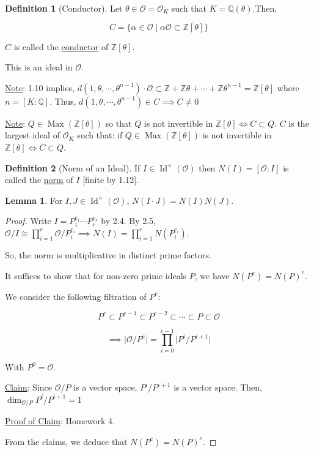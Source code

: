 \documentclass[openany]{amsbook}
\numberwithin{section}{chapter}
\theoremstyle{definition}
\newtheorem*{definition}{Definition}
\newtheorem{lemma}[theorem]{Lemma}
\begin{document}
\begin{definition}[Conductor]
    Let \(\theta \in \mathcal{O} = \mathcal{O}_K\) such that \(K = \mathbb{Q} (\theta)\).Then,

    \[
        C = \{ \alpha \in \mathcal{O} \mid \alpha \mathcal{O} \subset \mathbb{Z} [\theta] \} 
    \]

    \(C\) is called the \underline{conductor} of \(\mathbb{Z} [\theta]\).

    This is an ideal in \(\mathcal{O}\). 

    \underline{Note}: 1.10 implies, \(d(1, \theta , \cdots , \theta^{n-1})\cdot \mathcal{O} \subset \mathbb{Z} + \mathbb{Z} \theta + \cdots + \mathbb{Z} \theta ^{n-1} = \mathbb{Z} [\theta]\) where \(n = [K : \mathbb{Q}]\). Thus, \(d(1, \theta , \cdots , \theta^{n-1}) \in C \implies C \neq 0\)  

    \underline{Note}: \(Q\in \operatorname{Max} (\mathbb{Z} [\theta])\) so that \(Q\) is not invertible in \(\mathbb{Z}[\theta] \iff C \subset Q\). \(C\) is the largest ideal of \(\mathcal{O}_K\) such that: if \(Q \in \operatorname{Max}(\mathbb{Z}[\theta])\) is not invertible in \(\mathbb{Z} [\theta] \iff C \subset Q\).   

\end{definition}

\begin{definition}[Norm of an Ideal]
    If \(I \in \operatorname{Id} ^\times (\mathcal{O})\) then \(N(I) = [\mathcal{O} : I]\) is called the \underline{norm} of \(I\) [finite by 1.12].
\end{definition}

\begin{lemma}
    For \(I, J \in \operatorname{Id} ^\times (\mathcal{O})\), \(N(I \cdot J) = N(I)N(J)\).
\end{lemma}

\begin{proof}
    Write \(I = P_1^{e_1} \cdots P_r^{e_r}\) by 2.4. By 2.5, \(\mathcal{O} / I \cong \prod_{i=1}^{r} \mathcal{O} / P_i^{e_i} \implies N(I) = \prod_{i=1}^r N(P_i^{e_i})\). 

    So, the norm is multiplicative in distinct prime factors.

    It suffices to show that for non-zero prime ideals \(P\), we have \(N(P^e) = N(P)^e\).
    
    We consider the following filtration of \(P^e\):

    \[
        P^e \subset P^{e-1} \subset P^{e-2} \subset \cdots \subset P \subset \mathcal{O}
    \]

    \[
        \implies \vert \mathcal{O} / P^e \vert = \prod_{i=0}^{e-1} \vert P^i / P^{i+1} \vert
    \]

    With \(P^0 = \mathcal{O}\).

    \underline{Claim}: Since \(\mathcal{O} / P\) is a vector space, \(P^i / P^{i+1}\) is a vector space. Then, \(\dim_{\mathcal{O} / P} P^i / P^{i+1}  = 1\)
    
    \underline{Proof of Claim}: Homework 4.
    
    From the claims, we deduce that \(N(P^e)=N(P)^e\). 
\end{proof}
\end{document}
